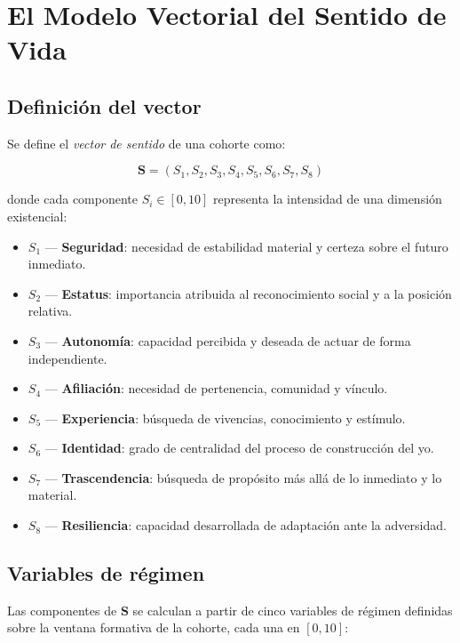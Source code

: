 \documentclass[conference,spanish]{IEEEtran}
\begin{document}
\section{El Modelo Vectorial del Sentido de Vida}
\label{sec:modelo}

\subsection{Definición del vector}

Se define el \textit{vector de sentido} de una cohorte como:

\begin{equation}
\mathbf{S} = (S_1, S_2, S_3, S_4, S_5, S_6, S_7, S_8)
\end{equation}

donde cada componente $S_i \in [0, 10]$ representa la intensidad de una dimensión existencial:

\begin{itemize}
  \item $S_1$ --- \textbf{Seguridad}: necesidad de estabilidad material y certeza sobre el futuro inmediato.
  \item $S_2$ --- \textbf{Estatus}: importancia atribuida al reconocimiento social y a la posición relativa.
  \item $S_3$ --- \textbf{Autonomía}: capacidad percibida y deseada de actuar de forma independiente.
  \item $S_4$ --- \textbf{Afiliación}: necesidad de pertenencia, comunidad y vínculo.
  \item $S_5$ --- \textbf{Experiencia}: búsqueda de vivencias, conocimiento y estímulo.
  \item $S_6$ --- \textbf{Identidad}: grado de centralidad del proceso de construcción del yo.
  \item $S_7$ --- \textbf{Trascendencia}: búsqueda de propósito más allá de lo inmediato y lo material.
  \item $S_8$ --- \textbf{Resiliencia}: capacidad desarrollada de adaptación ante la adversidad.
\end{itemize}

\subsection{Variables de régimen}

Las componentes de $\mathbf{S}$ se calculan a partir de cinco variables de régimen definidas sobre la ventana formativa de la cohorte, cada una en $[0, 10]$:
\end{document}
